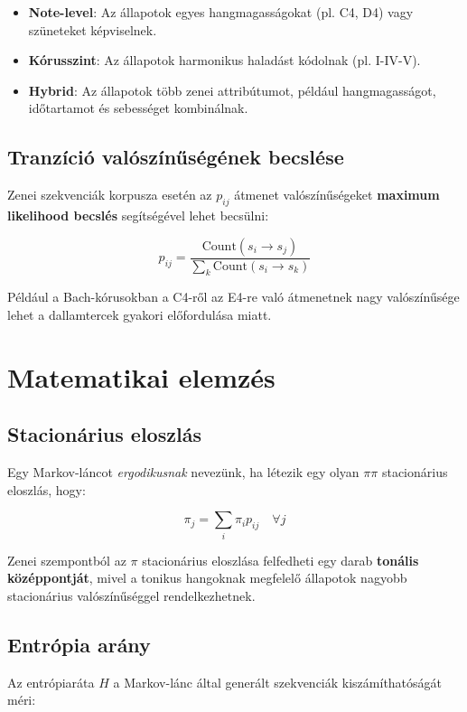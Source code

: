 \begin{itemize}
    \item \textbf{Note-level}: Az állapotok egyes hangmagasságokat (pl. C4, D4) vagy szüneteket képviselnek.
    \item \textbf{Kórusszint}: Az állapotok harmonikus haladást kódolnak (pl. I-IV-V).
    \item \textbf{Hybrid}: Az állapotok több zenei attribútumot, például hangmagasságot, időtartamot és sebességet kombinálnak.
\end{itemize}

\subsection{Tranzíció valószínűségének becslése}

Zenei szekvenciák korpusza esetén az \( p_{ij} \) átmenet valószínűségeket \textbf{maximum likelihood becslés} segítségével lehet becsülni:

\[
p_{ij} = \frac{\text{Count}(s_i \rightarrow s_j)}{\sum_{k} \text{Count}(s_i \rightarrow s_k)}
\]

Például a Bach-kórusokban a C4-ről az E4-re való átmenetnek nagy valószínűsége lehet a dallamtercek gyakori előfordulása miatt.

\section{Matematikai elemzés}

\subsection{Stacionárius eloszlás}

Egy Markov-láncot \textit{ergodikusnak} nevezünk, ha létezik egy olyan \( \pi \pi \) stacionárius eloszlás, hogy:

\[
\pi_j = \sum_{i} \pi_i p_{ij} \quad \forall j
\]

Zenei szempontból az \( \pi \) stacionárius eloszlása felfedheti egy darab \textbf{tonális középpontját}, mivel a tonikus hangoknak megfelelő állapotok nagyobb stacionárius valószínűséggel rendelkezhetnek.

\subsection{Entrópia arány}

Az entrópiaráta \( H \) a Markov-lánc által generált szekvenciák kiszámíthatóságát méri:

